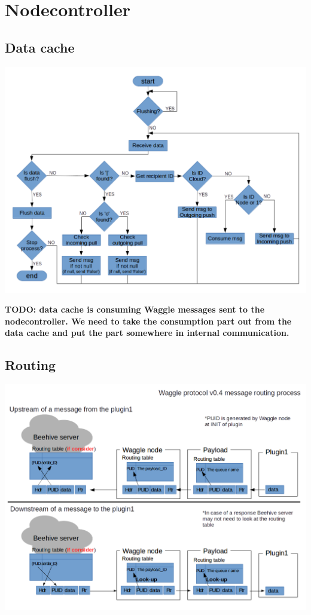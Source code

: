 \section{Nodecontroller}

\subsection{Data cache}

\includegraphics[width=\textwidth]{datacache_flowchart.png}

\textbf{TODO: data cache is consuming Waggle messages sent to the nodecontroller. We need to take the consumption part out from the data cache and put the part 
somewhere in internal communication.}

\subsection{Routing}
\label{routing}

\includegraphics[width=\textwidth]{routing_process.png}

